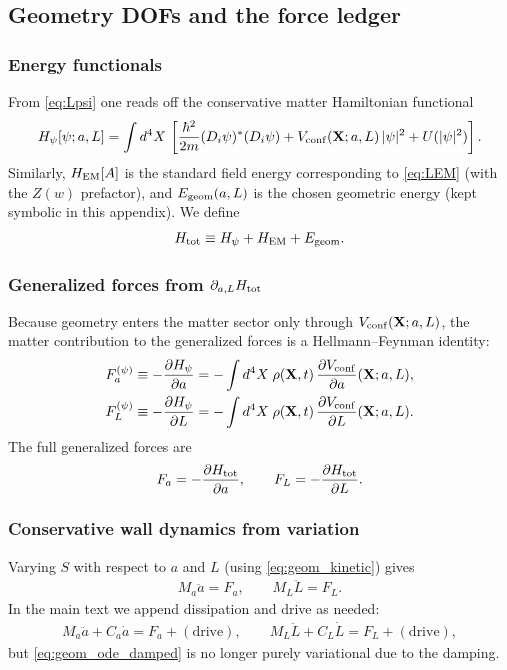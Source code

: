\documentclass[11pt]{article}
\begin{document}
\subsection{Geometry DOFs and the force ledger}
\subsubsection{Energy functionals}
From \eqref{eq:Lpsi} one reads off the conservative matter Hamiltonian functional
\begin{align}
H_\psi[\psi;a,L]
=
\int d^4X\,
\left[
\frac{\hbar^2}{2m}(D_i\psi)^\ast(D_i\psi)
+V_{\rm conf}(\mathbf{X};a,L)\,|\psi|^2
+U(|\psi|^2)
\right].
\label{eq:Hpsi}
\end{align}
Similarly, $H_{\rm EM}[A]$ is the standard field energy corresponding to
\eqref{eq:LEM} (with the $Z(w)$ prefactor), and $E_{\rm geom}(a,L)$ is the chosen
geometric energy (kept symbolic in this appendix).  We define
\begin{align}
H_{\rm tot} \equiv H_\psi + H_{\rm EM} + E_{\rm geom}.
\end{align}

\subsubsection{Generalized forces from \texorpdfstring{$\partial_{a,L}H_{\rm tot}$}{partial\_a,LH\_ tot}}
Because geometry enters the matter sector only through $V_{\rm conf}(\mathbf{X};a,L)$,
the matter contribution to the generalized forces is a Hellmann--Feynman identity:
\begin{align}
F_a^{(\psi)} \equiv -\frac{\partial H_\psi}{\partial a}
=
-\int d^4X\;\rho(\mathbf{X},t)\,\frac{\partial V_{\rm conf}}{\partial a}(\mathbf{X};a,L),
\label{eq:Fa_HF}
\\
F_L^{(\psi)} \equiv -\frac{\partial H_\psi}{\partial L}
=
-\int d^4X\;\rho(\mathbf{X},t)\,\frac{\partial V_{\rm conf}}{\partial L}(\mathbf{X};a,L).
\label{eq:FL_HF}
\end{align}
The full generalized forces are
\begin{align}
F_a = -\frac{\partial H_{\rm tot}}{\partial a},
\qquad
F_L = -\frac{\partial H_{\rm tot}}{\partial L}.
\label{eq:geom_forces}
\end{align}

\subsubsection{Conservative wall dynamics from variation}
Varying $S$ with respect to $a$ and $L$ (using \eqref{eq:geom_kinetic}) gives
\begin{align}
M_a \ddot a = F_a,
\qquad
M_L \ddot L = F_L.
\label{eq:geom_ode_conservative}
\end{align}
In the main text we append dissipation and drive as needed:
\begin{align}
M_a \ddot a + C_a \dot a = F_a + (\text{drive}),
\qquad
M_L \ddot L + C_L \dot L = F_L + (\text{drive}),
\label{eq:geom_ode_damped}
\end{align}
but \eqref{eq:geom_ode_damped} is no longer purely variational due to the damping.
\end{document}
